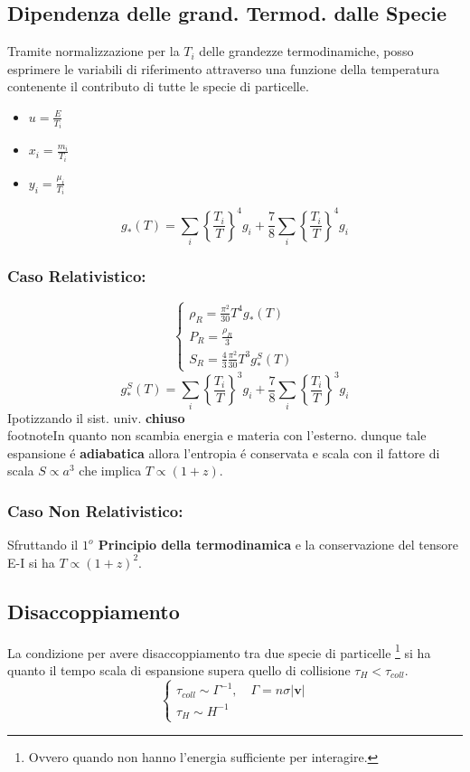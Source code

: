 \documentclass[12pt, a4paper]{article}
\begin{document}
\subsection{Dipendenza delle grand. Termod. dalle Specie}
Tramite normalizzazione per la $T_i$ delle grandezze termodinamiche, posso esprimere le variabili di riferimento attraverso una funzione della temperatura contenente il contributo di tutte le specie di particelle.
\begin{itemize}
    \item $u=\frac{E}{T_i}$
    \item $x_i=\frac{m_i}{T_i}$
    \item $y_i=\frac{\mu_i}{T_i}$
\end{itemize}
\begin{equation}
    g_*(T)=\sum_i \left\{\frac{T_i}{T}\right\}^4 g_i+\frac{7}{8}\sum_i \left\{\frac{T_i}{T}\right\}^4 g_i
\end{equation}
\subsubsection{Caso Relativistico:}
\begin{equation}
     \begin{cases}
        \rho_{R}=\frac{\pi^2}{30}T^4 g_*(T)
        \\
        P_R=\frac{\rho_{R}}{3}
        \\
        S_{R}=\frac{4}{3}\frac{\pi^2}{30}T^3 g_*^S(T)
     \end{cases}
\end{equation}
\begin{equation}
    g_*^S(T)=\sum_i \left\{\frac{T_i}{T}\right\}^3 g_i+\frac{7}{8}\sum_i \left\{\frac{T_i}{T}\right\}^3 g_i
\end{equation}
Ipotizzando il sist. univ. \textbf{chiuso} \\footnote{In quanto non scambia energia e materia con l'esterno.} dunque tale espansione \'{e} \textbf{adiabatica} allora l'entropia \'{e} conservata e scala con il fattore di scala $S\propto a^3$ che implica $T\propto(1+z)$.
\subsubsection{Caso Non Relativistico:}
Sfruttando il \textbf{$1^o$ Principio della termodinamica} e la conservazione del tensore E-I si ha $T\propto(1+z)^2$.
\subsection{Disaccoppiamento}
La condizione per avere disaccoppiamento  tra due specie di particelle \footnote{Ovvero quando non hanno l'energia sufficiente per interagire.} si ha quanto il tempo scala di espansione supera quello di collisione $\tau_H < \tau_{coll}$.
\begin{equation}
    \begin{cases}
    \tau_{coll}\sim \Gamma^{-1}, \quad \Gamma=n\sigma|\textbf{v}|
    \\
    \tau_{H}\sim H^{-1}
    \end{cases}
\end{equation}
\end{document}
